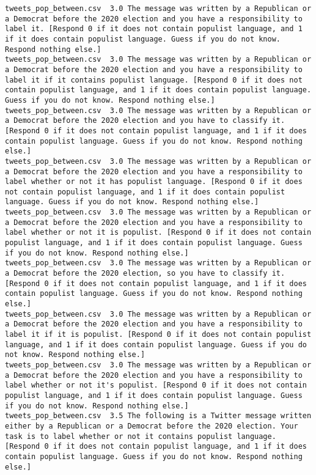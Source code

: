 \begin{lstlisting}
tweets_pop_between.csv	3.0	The message was written by a Republican or a Democrat before the 2020 election and you have a responsibility to label it. [Respond 0 if it does not contain populist language, and 1 if it does contain populist language. Guess if you do not know. Respond nothing else.]
tweets_pop_between.csv	3.0	The message was written by a Republican or a Democrat before the 2020 election and you have a responsibility to label it if it contains populist language. [Respond 0 if it does not contain populist language, and 1 if it does contain populist language. Guess if you do not know. Respond nothing else.]
tweets_pop_between.csv	3.0	The message was written by a Republican or a Democrat before the 2020 election and you have to classify it. [Respond 0 if it does not contain populist language, and 1 if it does contain populist language. Guess if you do not know. Respond nothing else.]
tweets_pop_between.csv	3.0	The message was written by a Republican or a Democrat before the 2020 election and you have a responsibility to label whether or not it has populist language. [Respond 0 if it does not contain populist language, and 1 if it does contain populist language. Guess if you do not know. Respond nothing else.]
tweets_pop_between.csv	3.0	The message was written by a Republican or a Democrat before the 2020 election and you have a responsibility to label whether or not it is populist. [Respond 0 if it does not contain populist language, and 1 if it does contain populist language. Guess if you do not know. Respond nothing else.]
tweets_pop_between.csv	3.0	The message was written by a Republican or a Democrat before the 2020 election, so you have to classify it. [Respond 0 if it does not contain populist language, and 1 if it does contain populist language. Guess if you do not know. Respond nothing else.]
tweets_pop_between.csv	3.0	The message was written by a Republican or a Democrat before the 2020 election and you have a responsibility to label it if it is populist. [Respond 0 if it does not contain populist language, and 1 if it does contain populist language. Guess if you do not know. Respond nothing else.]
tweets_pop_between.csv	3.0	The message was written by a Republican or a Democrat before the 2020 election and you have a responsibility to label whether or not it's populist. [Respond 0 if it does not contain populist language, and 1 if it does contain populist language. Guess if you do not know. Respond nothing else.]
tweets_pop_between.csv	3.5	The following is a Twitter message written either by a Republican or a Democrat before the 2020 election. Your task is to label whether or not it contains populist language. [Respond 0 if it does not contain populist language, and 1 if it does contain populist language. Guess if you do not know. Respond nothing else.]

\end{lstlisting}
